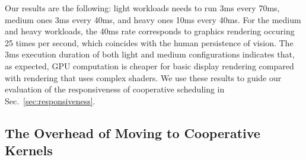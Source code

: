 \documentclass[numbers,nocopyrightspace,10pt]{sigplanconf}
\newcommand{\mytablong}{Table~}
\newcommand{\mysec}{Sec.~}
\begin{document}

Our results are the following: light workloads needs to run 3ms every
70ms, medium ones 3ms every 40ms, and heavy ones 10ms every 40ms. For
the medium and heavy workloads, the 40ms rate corresponds to graphics
rendering occuring 25 times per second, which coincides with the human
persistence of vision. The 3ms execution duration of both light and
medium configurations indicates that, as expected, GPU computation is
cheaper for basic display rendering compared with rendering that uses
complex shaders. We use these results to guide our evaluation of the
responsiveness of cooperative scheduling in
\mysec\ref{sec:responsiveness}.



\subsection{The Overhead of Moving to Cooperative Kernels}\label{sec:overhead}

\end{document}
